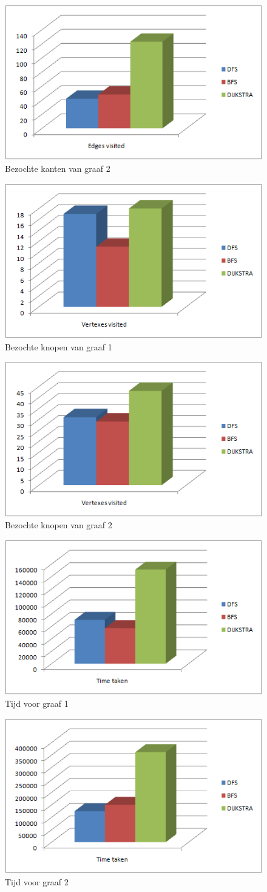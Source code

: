 \begin{figure}[h]
 \centering
 \includegraphics[width=0.5\linewidth]{conclusion/graph2_edges}
 \caption{Bezochte kanten van graaf 2}
 \label{fig:graph2_edges}
\end{figure}

\begin{figure}[h]
 \centering
 \includegraphics[width=0.5\linewidth]{conclusion/graph1_vertexes}
 \caption{Bezochte knopen van graaf 1}
 \label{fig:graph1_vertexes}
\end{figure}

\begin{figure}[h]
 \centering
 \includegraphics[width=0.5\linewidth]{conclusion/graph2_vertex}
 \caption{Bezochte knopen van graaf 2}
 \label{fig:graph2_vertexes}
\end{figure}

\begin{figure}[h]
 \centering
 \includegraphics[width=0.5\linewidth]{conclusion/graph1_time}
 \caption{Tijd voor graaf 1}
 \label{fig:graph1_time}
\end{figure}

\begin{figure}[h]
 \centering
 \includegraphics[width=0.5\linewidth]{conclusion/graph2_time}
 \caption{Tijd voor graaf 2}
 \label{fig:graph2_time}
\end{figure}